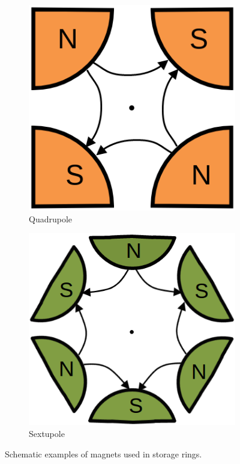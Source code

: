 \begin{figure}
\begin{subfigure}[t]{0.32\textwidth}
\includegraphics[width=1.0\textwidth]{figures/quadrupole_example.png}
    \caption{Quadrupole}
    \label{subfig:quadrupole}
\end{subfigure}
 \begin{subfigure}[t]{0.32\textwidth}
    \includegraphics[width=1.08\textwidth]{figures/sextupole_example.png}
    \caption{Sextupole}
    \label{subfig:sextupole}
\end{subfigure}
\caption{Schematic examples of magnets used in storage rings.}
\label{fig:magnets}
\end{figure}

